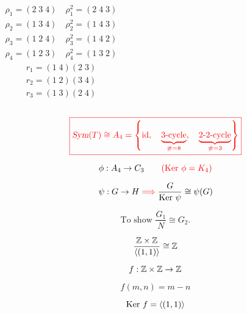 \begin{frame}
  \begin{columns}
	  \begin{align*}
		\rho_{1} = (2\; 3\; 4)\quad \rho_{1}^{2} = (2\; 4\; 3) \\[3pt]
		\rho_{2} = (1\; 3\; 4)\quad \rho_{2}^{2} = (1\; 4\; 3) \\[3pt]
		\rho_{3} = (1\; 2\; 4)\quad \rho_{3}^{2} = (1\; 4\; 2) \\[3pt]
		\rho_{4} = (1\; 2\; 3)\quad \rho_{4}^{2} = (1\; 3\; 2)
	  \end{align*}
	  \begin{align*}
		r_1 = (1\; 4) (2\; 3) \\[6pt]
		r_2 = (1\; 2) (3\; 4) \\[6pt]
		r_3 = (1\; 3) (2\; 4)
	  \end{align*}
  \end{columns}

  \vspace{0.60cm}
  \[
	\textcolor{red}{\boxed{\textsl{Sym}(T) \cong A_4 = \left\{\text{id},\quad \underbrace{\text{3-cycle}}_{\# = 8},\quad \underbrace{\text{2-2-cycle}}_{\# = 3}\right\}}}
  \]
\end{frame}

\begin{frame}
  \[
	\phi: A_4 \to C_3 \qquad \textcolor{red}{(\text{Ker } \phi = K_4)}
  \]
\end{frame}

\begin{frame}
  \begin{theorem}
	\[
	  \psi: G \to H \textcolor{red}{\implies} \frac{G}{\text{Ker } \psi} \cong \psi(G)
	\]
  \end{theorem}

  \pause
  \[
	\text{To show } \frac{G_1}{N} \cong G_2.
  \]
\end{frame}

\begin{frame}
  \[
	\frac{\mathbb{Z} \times \mathbb{Z}}{\langle (1, 1) \rangle} \cong \mathbb{Z}
  \]

  \pause
  \[
	f: \mathbb{Z} \times \mathbb{Z} \to \mathbb{Z}
  \]

  \pause
  \[
	f(m, n) = m - n
  \]

  \pause
  \[
	\text{Ker } f = \langle (1, 1) \rangle
  \]
\end{frame}

